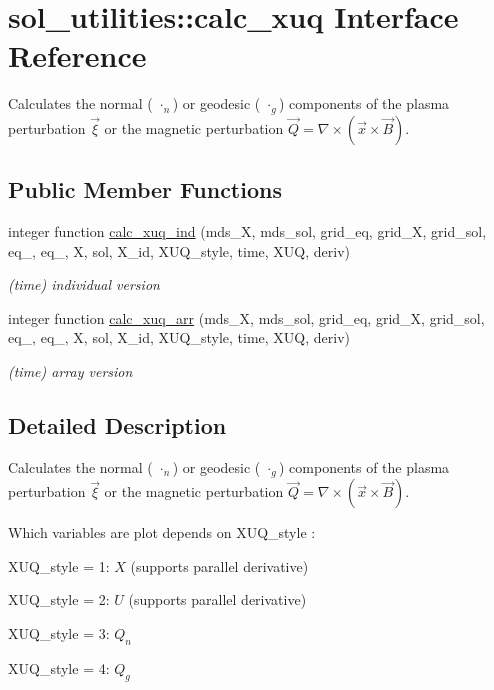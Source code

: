 \hypertarget{interfacesol__utilities_1_1calc__xuq}{}\section{sol\+\_\+utilities\+:\+:calc\+\_\+xuq Interface Reference}
\label{interfacesol__utilities_1_1calc__xuq}


Calculates the normal ( $\cdot_n$) or geodesic ( $\cdot_g$) components of the plasma perturbation $\vec{\xi}$ or the magnetic perturbation $\vec{Q} = \nabla \times \left(\vec{x} \times \vec{B}\right)$.  


\subsection*{Public Member Functions}
\begin{DoxyCompactItemize}
\item 
integer function \hyperlink{interfacesol__utilities_1_1calc__xuq_a5a102e1e32fac72b138a38df4c543134}{calc\+\_\+xuq\+\_\+ind} (mds\+\_\+X, mds\+\_\+sol, grid\+\_\+eq, grid\+\_\+X, grid\+\_\+sol, eq\+\_, eq\+\_, X, sol, X\+\_\+id, X\+U\+Q\+\_\+style, time, X\+UQ, deriv)
\begin{DoxyCompactList}\small\item\em (time) individual version \end{DoxyCompactList}\item 
integer function \hyperlink{interfacesol__utilities_1_1calc__xuq_a17d7f9af7119c48b7203cf683f80d304}{calc\+\_\+xuq\+\_\+arr} (mds\+\_\+X, mds\+\_\+sol, grid\+\_\+eq, grid\+\_\+X, grid\+\_\+sol, eq\+\_, eq\+\_, X, sol, X\+\_\+id, X\+U\+Q\+\_\+style, time, X\+UQ, deriv)
\begin{DoxyCompactList}\small\item\em (time) array version \end{DoxyCompactList}\end{DoxyCompactItemize}


\subsection{Detailed Description}
Calculates the normal ( $\cdot_n$) or geodesic ( $\cdot_g$) components of the plasma perturbation $\vec{\xi}$ or the magnetic perturbation $\vec{Q} = \nabla \times \left(\vec{x} \times \vec{B}\right)$. 

Which variables are plot depends on {\ttfamily X\+U\+Q\+\_\+style} \cite{Weyens3D} \+:
\begin{DoxyItemize}
\item {\ttfamily X\+U\+Q\+\_\+style} = 1\+: $X$ (supports parallel derivative)
\item {\ttfamily X\+U\+Q\+\_\+style} = 2\+: $U$ (supports parallel derivative)
\item {\ttfamily X\+U\+Q\+\_\+style} = 3\+: $Q_n$
\item {\ttfamily X\+U\+Q\+\_\+style} = 4\+: $Q_g$
\end{DoxyItemize}

